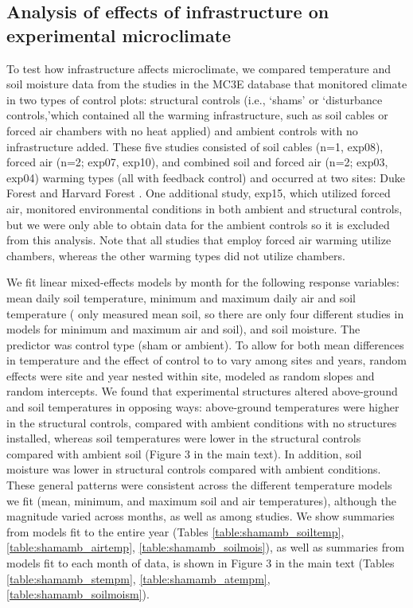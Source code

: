 \documentclass{article}
\begin{document}
\subsection* {Analysis of effects of infrastructure on experimental microclimate}
To test how infrastructure affects microclimate, we compared temperature and soil moisture data from the studies in the MC3E database that monitored climate in two types of control plots: structural controls (i.e., `shams' or `disturbance controls,'which contained all the warming infrastructure, such as soil cables or forced air chambers with no heat applied) and ambient controls with no infrastructure added. These five studies consisted of soil cables (n=1, exp08), forced air (n=2; exp07, exp10), and combined soil and forced air (n=2; exp03, exp04) warming types (all with feedback control) and occurred at two sites: Duke Forest and Harvard Forest \citep{farnsworth1995,clark2014a,marchin2015,pelini2011}. One additional study, exp15, which utilized forced air, monitored environmental conditions in both ambient and structural controls, but we were only able to obtain data for the ambient controls so it is excluded from this analysis. Note that all studies that employ forced air warming utilize chambers, whereas the other warming types did not utilize chambers.
\par We fit linear mixed-effects models by month for the following response variables: mean daily soil temperature, minimum and maximum daily air and soil temperature (\citet{farnsworth1995} only measured mean soil, so there are only four different studies in models for minimum and maximum air and soil), and soil moisture. The predictor was control type (sham or ambient). To allow for both mean differences in temperature and the effect of control to to vary among sites and years, random effects were site and year nested within site, modeled as random slopes and random intercepts. 
We found that experimental structures altered above-ground and soil temperatures in opposing ways: above-ground temperatures were higher in the structural controls, compared with ambient conditions with no structures installed, whereas soil temperatures were lower in the structural controls compared with ambient soil (Figure 3 in the main text).  In addition, soil moisture was lower in structural controls compared with ambient conditions. These general patterns were consistent across the different temperature models we fit (mean, minimum, and maximum soil and air temperatures), although the magnitude varied across months, as well as among studies. We show summaries from models fit to the entire year (Tables \ref{table:shamamb_soiltemp}, \ref{table:shamamb_airtemp}, \ref{table:shamamb_soilmois}), as well as summaries from models fit to each month of data, is shown in Figure 3 in the main text (Tables \ref{table:shamamb_stempm}, \ref{table:shamamb_atempm}, \ref{table:shamamb_soilmoism}).
\end{document}
